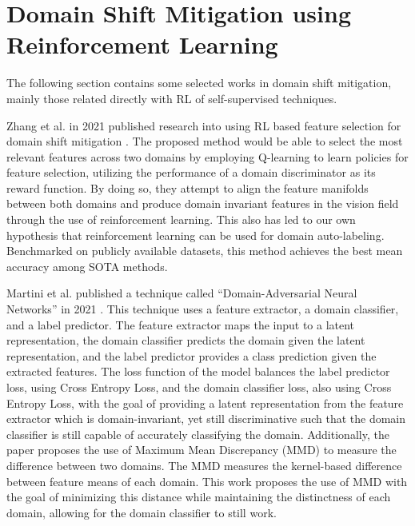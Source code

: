 \section{Domain Shift Mitigation using Reinforcement Learning}\label{sec:literature-domain-rl}

The following section contains some selected works in domain shift mitigation, mainly those related directly with RL of self-supervised techniques.

Zhang et al. in 2021 published research into using RL based feature selection for domain shift mitigation \cite{zhang2021adversarial}.
The proposed method would be able to select the most relevant features across two domains by employing Q-learning to learn policies for feature selection, utilizing the performance of a domain discriminator as its reward function.
By doing so, they attempt to align the feature manifolds between both domains and produce domain invariant features in the vision field through the use of reinforcement learning.
This also has led to our own hypothesis that reinforcement learning can be used for domain auto-labeling.
Benchmarked on publicly available datasets, this method achieves the best mean accuracy among SOTA methods.

Martini et al. published a technique called ``Domain-Adversarial Neural Networks'' in 2021 \cite{martini2021domain}.
This technique uses a feature extractor, a domain classifier, and a label predictor.
The feature extractor maps the input to a latent representation, the domain classifier predicts the domain given the latent representation, and the label predictor provides a class prediction given the extracted features.
The loss function of the model balances the label predictor loss, using Cross Entropy Loss, and the domain classifier loss, also using Cross Entropy Loss, with the goal of providing a latent representation from the feature extractor which is domain-invariant, yet still discriminative such that the domain classifier is still capable of accurately classifying the domain.
Additionally, the paper proposes the use of Maximum Mean Discrepancy (MMD) to measure the difference between two domains.
The MMD measures the kernel-based difference between feature means of each domain.
This work proposes the use of MMD with the goal of minimizing this distance while maintaining the distinctness of each domain, allowing for the domain classifier to still work.
